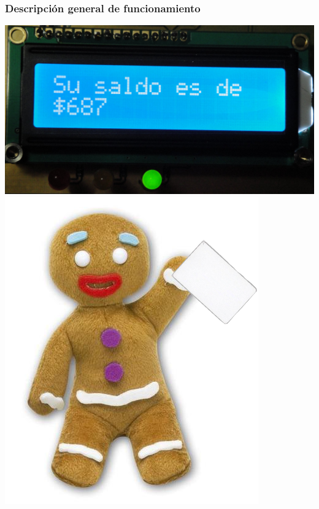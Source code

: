 \documentclass{beamer}
\begin{document}
\begin{frame}
	\frametitle{Descripción general de funcionamiento}
	\begin{center}
		\includegraphics[scale=.08]{Imagenes/saldode.jpg}
		\includegraphics[scale=.35]{Imagenes/pinpon_tarj.png}
	\end{center}
\end{frame}	
\end{document}
